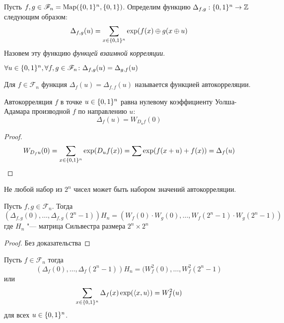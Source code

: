 \begin{definition}
Пусть $f,g \in \mathscr{F}_n = \operatorname*{Map}(\{0,1\}^n, \{0,1\})$. Определим функцию 
$\Delta_{f,g}: \{0,1\}^n \to \mathbb{Z}$ следующим образом:
$$\Delta_{f,g} (u) = \sum\limits_{x \in \{0,1\}^n} \exp (f(x) \oplus g(x \oplus u)$$
Назовем эту функцию \emph{функцей взаимной корреляции}.
\end{definition}

\begin{proposition}
$\forall u \in \{0,1\}^n, \forall f,g \in \mathscr{F}_n \colon 
   \Delta_{f,g} (u) = \Delta_{g,f} (u)$
\end{proposition}

\begin{definition}
Для $f \in \mathscr{F}_n$ функция $\Delta_f (u) = \Delta_{f,f} (u)$ называется
функцией автокорреляции.
\end{definition}

\begin{remark}
Автокорреляция $f$ в точке $u \in \{0,1\}^n$ равна нулевому коэффициенту
Уолша-Адамара производной $f$ по направлению $u$:
$$\Delta_f(u) = W_{D_u f} (0)$$
\end{remark}

\begin{proof}
$$W_{D_f u} (0) = \sum\limits_{x \in \{0,1\}^n} \exp (D_u f(x)) 
            = \sum\limits \exp (f(x+u) + f(x)) = \Delta_f (u)$$
\end{proof}

\begin{remark}
Не любой набор из $2^n$ чисел может быть набором значений
автокорреляции.
\end{remark}

\begin{theorem}
Пусть $f,g \in \mathscr{F}_n$. Тогда
  $$(\Delta_{f,g} (0), \ldots, \Delta_{f,g} (2^n - 1)) H_n =
     (W_f(0) \cdot W_g(0), \ldots, W_f(2^n -1) \cdot W_g(2^n-1))$$
 где $H_n$ "--- матрица Сильвестра размера $2^n \times 2^n$
\end{theorem}

\begin{proof}
Без доказательства
\end{proof}

\begin{corollary}
Пусть $f \in \mathscr{F}_n$ тогда 
$$(\Delta_f(0), \ldots, \Delta_f(2^n-1)) H_n = (W_f^2(0), \ldots, W_f^2 (2^n -1)$$
или
$$\sum\limits_{x \in \{0,1\}^n} \Delta_f(x) \exp(\langle x,u \rangle) = W_f^2(u)$$
для всех $u \in \{0,1\}^n$.
\end{corollary}

